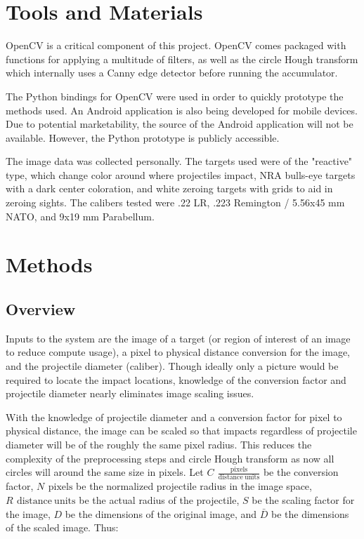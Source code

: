 \documentclass{article}
\newcommand{\unit}[1]{\ensuremath{\, \mathrm{#1}}}
\begin{document}
\section{Tools and Materials}
\label{sec:tools}
OpenCV is a critical component of this project. OpenCV comes packaged with functions for
applying a multitude of filters, as well as the circle Hough transform which internally uses a
Canny edge detector before running the accumulator.

The Python bindings for OpenCV were used in order to quickly prototype the methods used.
An Android application is also being developed for mobile devices.
Due to potential marketability, the source of the Android application will not be available.
However, the Python prototype is publicly accessible.

The image data was collected personally. The targets used were of the "reactive" type, which
change color around where projectiles impact, NRA bulls-eye targets with a dark center coloration, and
white zeroing targets with grids to aid in zeroing sights. The calibers tested were .22 LR,
.223 Remington / 5.56x45 mm NATO, and 9x19 mm Parabellum.

\section{Methods}
\label{sec:methods}

\subsection{Overview}
\label{ssec:overview}
Inputs to the system are the image of a target (or region of interest of an image to reduce
compute usage), a pixel to physical distance conversion for the image,
and the projectile diameter (caliber). Though ideally only a picture would
be required to locate the impact locations, knowledge of the conversion factor and projectile
diameter nearly eliminates image scaling issues.

With the knowledge of projectile diameter and a conversion factor for pixel to physical distance,
the image can be scaled so that impacts regardless of projectile diameter will be of the roughly
the same pixel radius. This reduces the complexity of the preprocessing steps and circle Hough
transform as now all circles will around the same size in pixels.
Let \(C\ \unit{\frac{pixels}{distance\ units}}\) be the conversion factor, \(N\ \unit{pixels}\)
be the normalized projectile radius in the image space, \(R\ \unit{distance\ units}\) be the 
actual radius of the projectile, \(S\) be the scaling factor for the image, \(D\) be 
the dimensions of the original image, and \(\bar{D}\) be the dimensions of the scaled image.
Thus:
\end{document}
